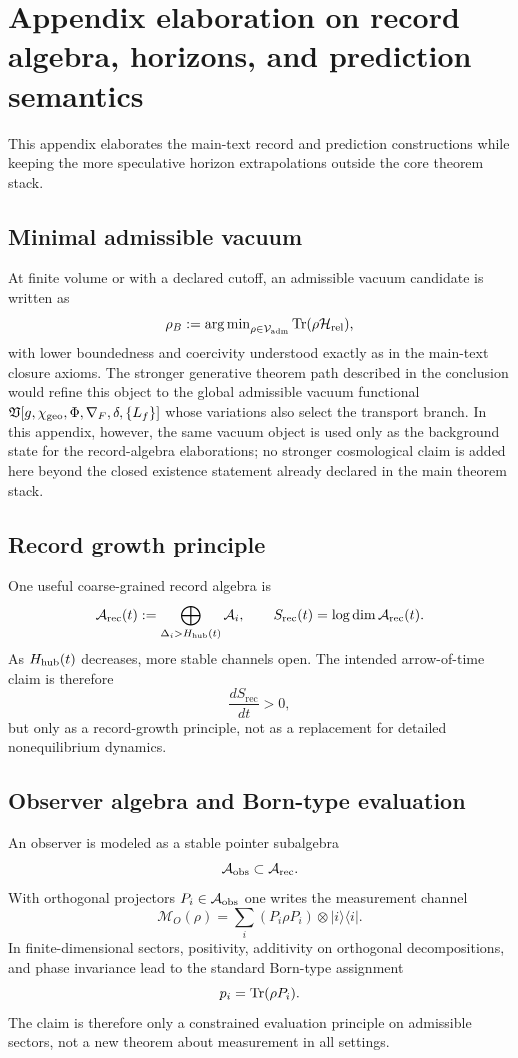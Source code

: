 \section{Appendix elaboration on record algebra, horizons, and prediction semantics}
\label{app:record}

This appendix elaborates the main-text record and prediction constructions while keeping the more speculative horizon extrapolations outside the core theorem stack.

\subsection{Minimal admissible vacuum}

At finite volume or with a declared cutoff, an admissible vacuum candidate is written as
\[
\rho_B
:=
\operatorname{arg\,min}_{\rho\in\mathcal V_{\mathrm{adm}}}\operatorname{Tr}(\rho\mathcal H_{\mathrm{rel}}),
\]
with lower boundedness and coercivity understood exactly as in the main-text closure axioms. The stronger generative theorem path described in the conclusion would refine this object to the global admissible vacuum functional $\mathfrak V[g,\chi_{\mathrm{geo}},\Phi,\nabla_F,\delta,\{L_f\}]$ whose variations also select the transport branch. In this appendix, however, the same vacuum object is used only as the background state for the record-algebra elaborations; no stronger cosmological claim is added here beyond the closed existence statement already declared in the main theorem stack.

\subsection{Record growth principle}

One useful coarse-grained record algebra is
\[
\mathcal A_{\mathrm{rec}}(t):=\bigoplus_{\Delta_i>H_{\mathrm{hub}}(t)}\mathcal A_i,
\qquad
S_{\mathrm{rec}}(t)=\log\dim\mathcal A_{\mathrm{rec}}(t).
\]
As $H_{\mathrm{hub}}(t)$ decreases, more stable channels open. The intended arrow-of-time claim is therefore
\[
\frac{dS_{\mathrm{rec}}}{dt}>0,
\]
but only as a record-growth principle, not as a replacement for detailed nonequilibrium dynamics.

\subsection{Observer algebra and Born-type evaluation}

An observer is modeled as a stable pointer subalgebra
\[
\mathcal A_{\mathrm{obs}}\subset\mathcal A_{\mathrm{rec}}.
\]
With orthogonal projectors $P_i\in\mathcal A_{\mathrm{obs}}$ one writes the measurement channel
\[
\mathcal M_O(\rho)=\sum_i(P_i\rho P_i)\otimes |i\rangle\langle i|.
\]
In finite-dimensional sectors, positivity, additivity on orthogonal decompositions, and phase invariance lead to the standard Born-type assignment
\[
p_i=\operatorname{Tr}(\rho P_i).
\]
The claim is therefore only a constrained evaluation principle on admissible sectors, not a new theorem about measurement in all settings.

